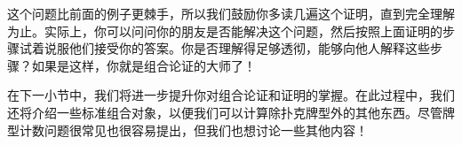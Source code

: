 \begin{example}
    这个问题比前面的例子更棘手，所以我们鼓励你多读几遍这个证明，直到完全理解为止。实际上，你可以问问你的朋友是否能解决这个问题，然后按照上面证明的步骤试着说服他们接受你的答案。你是否理解得足够透彻，能够向他人解释这些步骤？如果是这样，你就是组合论证的大师了！

    在下一小节中，我们将进一步提升你对组合论证和证明的掌握。在此过程中，我们还将介绍一些标准组合对象，以便我们可以计算除扑克牌型外的其他东西。尽管牌型计数问题很常见也很容易提出，但我们也想讨论一些其他内容！
\end{example}